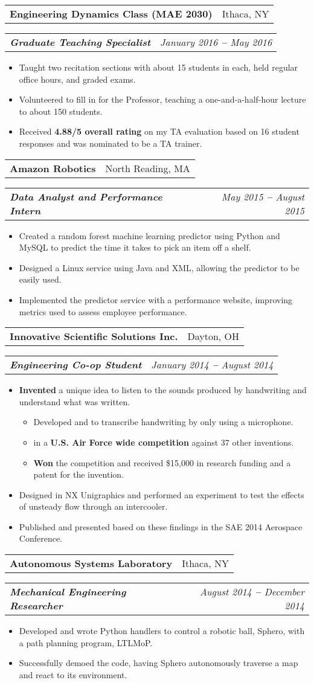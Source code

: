 \documentclass[letterpaper,11pt]{article}
\makeatletter
\def\vspaceAfterBullets{3pt} %
\def\bulletIndent{15pt} %
\newcommand{\bulletItem}[1]{
  \item\small{
    {#1}
  }
}
\newcommand{\companyNameAndLocationHeading}[2]{
  \item 
    \begin{tabular*}{1.0\textwidth}[b]{l@{\extracolsep{\fill}}r}
      \textbf{#1} & #2
    \end{tabular*}
}
\newcommand{\titleAndDateHeading}[2]{
    \item
    \begin{tabular*}{1.0\textwidth}[b]{l@{\extracolsep{\fill}}r}
      \textit{\textbf{\small#1}} & \textit{\small #2}
    \end{tabular*}
}
\newcommand{\outerBulletListStart}{\begin{itemize}[leftmargin=\bulletIndent]}
\newcommand{\outerBulletListEnd}{\end{itemize}\vspace{\vspaceAfterBullets}}
\newcommand{\innerBulletListStart}{\begin{itemize}[leftmargin=\bulletIndent]}
\newcommand{\innerBulletListEnd}{\end{itemize}}
\newcommand{\bref}[2]{\href{#1}{\color{blue}{#2}}}
\makeatother
\begin{document}
\companyNameAndLocationHeading
{Engineering Dynamics Class (MAE 2030)}{Ithaca, NY}
\titleAndDateHeading
{Graduate Teaching Specialist}{January 2016 \textbf{--} May 2016}
\outerBulletListStart
\bulletItem{Taught two recitation sections with about 15 students in each, held regular office hours, and graded exams.}
\bulletItem{Volunteered to fill in for the Professor, teaching a one-and-a-half-hour lecture to about 150 students.}
\bulletItem{Received \textbf{4.88/5 overall rating} on my TA evaluation based on 16 student responses and was nominated to be a TA trainer.}
\outerBulletListEnd

\companyNameAndLocationHeading
{Amazon Robotics}{North Reading, MA}
\titleAndDateHeading
{Data Analyst and Performance Intern}{May 2015 \textbf{--} August 2015}
\outerBulletListStart
\bulletItem{Created a random forest machine learning predictor using Python and MySQL to predict the time it takes to pick an item off a shelf.}
\bulletItem{Designed a Linux service using Java and XML, allowing the predictor to be easily used.}
\bulletItem{Implemented the predictor service with a performance website, improving metrics used to assess employee performance.}
\outerBulletListEnd

\companyNameAndLocationHeading
{Innovative Scientific Solutions Inc.}{Dayton, OH}
\titleAndDateHeading
{Engineering Co-op Student}{January 2014 \textbf{--} August 2014}
\outerBulletListStart
\bulletItem{\textbf{Invented} a unique idea to listen to the sounds produced by handwriting and understand what was written.}
\innerBulletListStart
\bulletItem{Developed and \bref{https://github.com/jam643/WriteHear/tree/master}{coded a MATLAB program} to transcribe handwriting by only using a microphone.}
\bulletItem{\bref{https://github.com/jam643/WriteHear/blob/master/WriteHear.pdf}{Presented my invention} in a \textbf{U.S. Air Force wide competition} against 37 other inventions.}
\bulletItem{\textbf{Won} the competition and received \$15,000 in research funding and a patent for the invention.}
\innerBulletListEnd
\bulletItem{Designed in NX Unigraphics and performed an experiment to test the effects of unsteady flow through an intercooler.}
\bulletItem{Published and presented \bref{https://www.researchgate.net/publication/290192705_Effect_of_Unsteady_Flow_on_Intercooler_Performance}{a conference paper} based on these findings in the SAE 2014 Aerospace Conference.}
\outerBulletListEnd

\companyNameAndLocationHeading
{Autonomous Systems Laboratory}{Ithaca, NY}
\titleAndDateHeading
{Mechanical Engineering Researcher}{August 2014 \textbf{--} December 2014}
\outerBulletListStart
\bulletItem{Developed and wrote Python handlers to control a robotic ball, Sphero, with a path planning program, LTLMoP.}
\bulletItem{Successfully demoed the code, having Sphero autonomously traverse a map and react to its environment.}
\outerBulletListEnd
\end{document}
